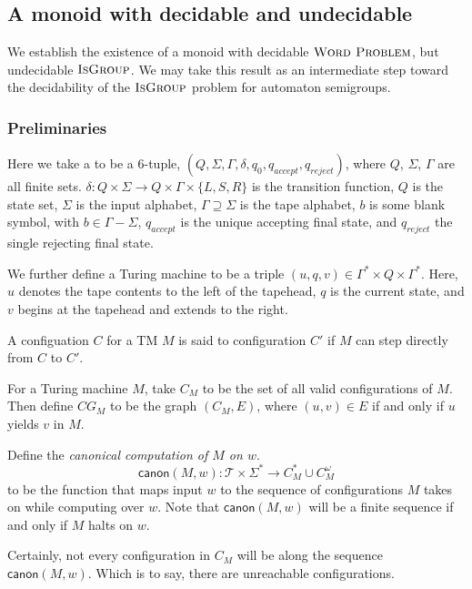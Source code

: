 \documentclass[11pt, titlepage]{article}
\begin{document}
\subsection{A monoid with decidable  and undecidable } 

We establish the existence of a monoid with decidable
$\textsc{Word Problem}$, but undecidable $\textsc{IsGroup}$. We may
take this result as an intermediate step toward the decidability of
the $\textsc{IsGroup}$ problem for automaton semigroups.

\subsubsection*{Preliminaries}
Here we take a  to be a 6-tuple,
$(Q, \Sigma, \Gamma, \delta, q_0, q_{accept}, q_{reject})$, where $Q$,
$\Sigma$, $\Gamma$ are all finite sets.
$\delta : Q \times \Sigma \rightarrow Q\times \Gamma \times \{L,S,R\}$
is the transition function, $Q$ is the state set, $\Sigma$ is the
input alphabet, $\Gamma \supseteq \Sigma$ is the tape alphabet, $b$ is
some blank symbol, with $b \in \Gamma - \Sigma$, $q_{accept}$ is the
unique accepting final state, and $q_{reject}$ the single rejecting
final state.

We further define a Turing machine  to be a triple
$(u, q, v) \in \Gamma^* \times Q \times \Gamma^*$. Here, $u$ denotes
the tape contents to the left of the tapehead, $q$ is the current
state, and $v$ begins at the tapehead and extends to the right.

A configuation $C$ for a TM $M$ is said to  configuration
$C'$ if $M$ can step directly from $C$ to $C'$.

For a Turing machine $M$, take $C_M$ to be the set of all valid
configurations of $M$. Then define $CG_M$ to be the graph $(C_M, E)$,
where $(u,v) \in E$ if and only if $u$ yields $v$ in $M$.
\begin{definition}
Define the \emph{canonical computation of $M$ on $w$}.
\[
  \textsf{canon}(M, w) : \mathcal{T} \times \Sigma^*
      \rightarrow
       C_M^*\cup C_M^\omega
\]
to be the function that maps input $w$ to the sequence of
configurations $M$ takes on while computing over $w$. Note that
$\textsf{canon}(M, w)$ will be a finite sequence if and only if $M$
halts on $w$.
\end{definition}

Certainly, not every configuration in $C_M$ will be along the sequence
$\textsf{canon}(M,w)$. Which is to say, there are unreachable
configurations.
\end{document}
